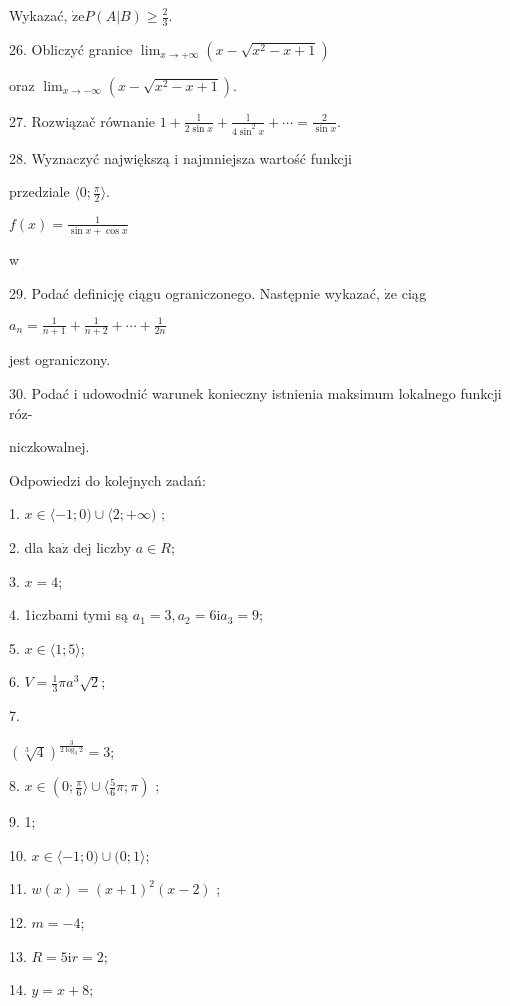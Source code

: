 \documentclass[a4paper,12pt]{article}
\begin{document}
Wykazać, $\displaystyle \dot{\mathrm{z}}\mathrm{e}P(A|B)\geq\frac{2}{3}.$

26. Obliczyć granice $\displaystyle \lim_{x\rightarrow+\infty}(x-\sqrt{x^{2}-x+1})$

oraz $\displaystyle \lim_{x\rightarrow-\infty}(x-\sqrt{x^{2}-x+1}).$

27. Rozwiązač równanie $1+\displaystyle \frac{\mathrm{l}}{2\sin x}+\frac{\mathrm{l}}{4\sin^{2}x}+\cdots=\frac{2}{\sin x}.$

28. Wyznaczyć największą i najmniejsza wartość funkcji

przedziale $\displaystyle \langle 0;\frac{\pi}{2}\rangle.$

$f(x) = \displaystyle \frac{1}{\sin x+\cos x}$

w

29. Podać definicję ciągu ograniczonego. Następnie wykazać, $\dot{\mathrm{z}}\mathrm{e}$ ciąg

$a_{n}=\displaystyle \frac{1}{n+1}+\frac{1}{n+2}+\cdots+\frac{1}{2n}$

jest ograniczony.

30. Podać i udowodnić warunek konieczny istnienia maksimum lokalnego funkcji róz-

niczkowalnej.





Odpowiedzi do kolejnych zadań:

1. $x\in\langle-1;0)\cup\langle 2;+\infty)$ ;

2. dla $\mathrm{k}\mathrm{a}\dot{\mathrm{z}}$ dej liczby $a\in R$;

3. $x=4$;

4. 1iczbami tymi są $a_{1}=3, a_{2}=6\mathrm{i}a_{3}=9$;

5. $ x\in\langle 1;5\rangle$;

6. $V=\displaystyle \frac{1}{3}\pi a^{3}\sqrt{2}$;

7.

$(\sqrt[3]{4})^{\frac{3}{2\log_{3}2}}=3$;

8. $x\displaystyle \in(0;\frac{\pi}{6}\rangle\cup\langle\frac{5}{6}\pi;\pi)$ ;

9. 1;

10. $ x\in\langle-1;0)\cup(0;1\rangle$;

11. $w(x)=(x+1)^{2}(x-2)$ ;

12. $m=-4$;

13. $R=5\mathrm{i}r=2$;

14. $y=x+8$;
\end{document}
